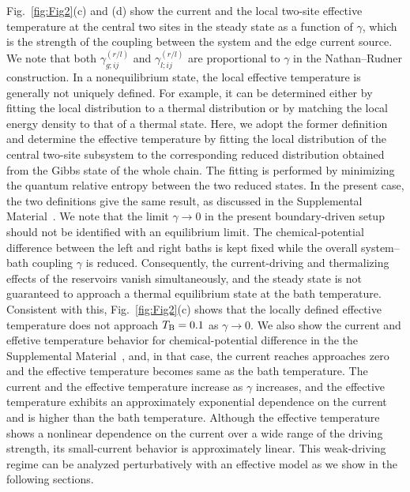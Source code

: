 \documentclass[a4paper, amsfonts, amssymb, amsmath, reprint, showkeys, nofootinbib, twoside,superscriptaddress, prb]{revtex4-2}
\begin{document}
Fig.~\ref{fig:Fig2}(c) and (d) show the current and the local two-site effective temperature at the central two sites in the steady state as a function of $\gamma$, which is the strength of the coupling between the system and the edge current source. We note that both $\gamma^{(r/l)}_{g;ij}$ and $\gamma^{(r/l)}_{l;ij}$ are proportional to $\gamma$ in the Nathan--Rudner construction. 
In a nonequilibrium state, the local effective temperature is generally not uniquely defined. For example, it can be determined either by fitting the local distribution to a thermal distribution or by matching the local energy density to that of a thermal state. 
Here, we adopt the former definition and determine the effective temperature by fitting the local distribution of the central two-site subsystem to the corresponding reduced distribution obtained from the Gibbs state of the whole chain. The fitting is performed by minimizing the quantum relative entropy between the two reduced states.
In the present case, the two definitions give the same result, as discussed in the Supplemental Material~\cite{Supple}.
We note that the limit $\gamma\rightarrow0$ in the present boundary-driven setup should not be identified with an equilibrium limit. The chemical-potential difference between the left and right baths is kept fixed while the overall system--bath coupling $\gamma$ is reduced. Consequently, the current-driving and thermalizing effects of the reservoirs vanish simultaneously, and the steady state is not guaranteed to approach a thermal equilibrium state at the bath temperature. Consistent with this, Fig.~\ref{fig:Fig2}(c) shows that the locally defined effective temperature does not approach $T_{\rm B}=0.1$ as $\gamma\rightarrow0$. We also show the current and effetive temperature behavior for chemical-potential difference in the the Supplemental Material~\cite{Supple}, and, in that case, the current reaches approaches zero and the effective temperature becomes same as the bath temperature.
The current and the effective temperature increase as $\gamma$ increases, and the effective temperature exhibits an approximately exponential dependence on the current and is higher than the bath temperature. Although the effective temperature shows a nonlinear dependence on the current over a wide range of the driving strength, its small-current behavior is approximately linear. This weak-driving regime can be analyzed perturbatively with an effective model as we show in the following sections.
 
\end{document}
